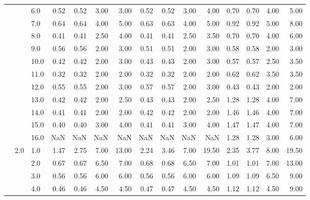 \begin{tabular}{lllrrrrrrrrrrrr}
     &     & 6.0  &       0.52 &      0.52 & 3.00 &   3.00 &       0.52 &      0.52 & 3.00 &   4.00 &       0.70 &      0.70 & 4.00 &   5.00 \\
     &     & 7.0  &       0.64 &      0.64 & 4.00 &   5.00 &       0.63 &      0.63 & 4.00 &   5.00 &       0.92 &      0.92 & 5.00 &   8.00 \\
     &     & 8.0  &       0.41 &      0.41 & 2.50 &   4.00 &       0.41 &      0.41 & 2.50 &   3.50 &       0.70 &      0.70 & 4.00 &   6.00 \\
     &     & 9.0  &       0.56 &      0.56 & 2.00 &   3.00 &       0.51 &      0.51 & 2.00 &   3.00 &       0.58 &      0.58 & 2.00 &   3.00 \\
     &     & 10.0 &       0.42 &      0.42 & 2.00 &   3.00 &       0.43 &      0.43 & 2.00 &   3.00 &       0.57 &      0.57 & 2.50 &   3.50 \\
     &     & 11.0 &       0.32 &      0.32 & 2.00 &   2.00 &       0.32 &      0.32 & 2.00 &   2.00 &       0.62 &      0.62 & 3.50 &   3.50 \\
     &     & 12.0 &       0.55 &      0.55 & 2.00 &   3.00 &       0.57 &      0.57 & 2.00 &   3.00 &       0.43 &      0.43 & 2.00 &   2.00 \\
     &     & 13.0 &       0.42 &      0.42 & 2.00 &   2.50 &       0.43 &      0.43 & 2.00 &   2.50 &       1.28 &      1.28 & 4.00 &   7.00 \\
     &     & 14.0 &       0.41 &      0.41 & 2.00 &   2.00 &       0.42 &      0.42 & 2.00 &   2.00 &       1.46 &      1.46 & 4.00 &   7.00 \\
     &     & 15.0 &       0.40 &      0.40 & 3.00 &   4.00 &       0.41 &      0.41 & 3.00 &   4.00 &       1.47 &      1.47 & 4.00 &   7.00 \\
     &     & 16.0 &        NaN &       NaN &  NaN &    NaN &        NaN &       NaN &  NaN &    NaN &       1.28 &      1.28 & 3.00 &   6.00 \\
     & 2.0 & 1.0  &       1.47 &      2.75 & 7.00 &  13.00 &       2.24 &      3.46 & 7.00 &  19.50 &       2.35 &      3.77 & 8.00 &  19.50 \\
     &     & 2.0  &       0.67 &      0.67 & 6.50 &   7.00 &       0.68 &      0.68 & 6.50 &   7.00 &       1.01 &      1.01 & 7.00 &  13.00 \\
     &     & 3.0  &       0.56 &      0.56 & 6.00 &   6.00 &       0.56 &      0.56 & 6.00 &   6.00 &       1.09 &      1.09 & 6.50 &   9.00 \\
     &     & 4.0  &       0.46 &      0.46 & 4.50 &   4.50 &       0.47 &      0.47 & 4.50 &   4.50 &       1.12 &      1.12 & 4.50 &   9.00 \\

\end{tabular}
